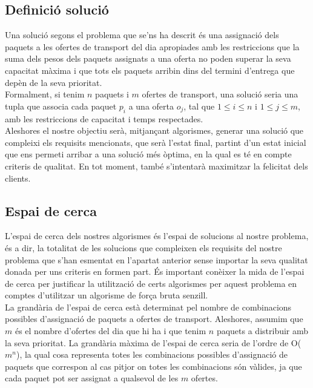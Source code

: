 \documentclass[a4paper]{article}
\begin{document}
	\subsection{Definició solució}

	Una solució segons el problema que se'ns ha descrit és una assignació dels paquets a les ofertes de transport del dia apropiades amb les restriccions que la suma dels pesos dels paquets assignats a una oferta no poden superar la seva capacitat màxima i que tots els paquets arribin dins del termini d'entrega que depèn de la seva prioritat. \\

	Formalment, si tenim $n$ paquets i $m$ ofertes de transport, una solució seria una tupla que associa cada paquet $p_i$ a una oferta $o_j$, tal que $1 \leq i \leq n$ i $1 \leq j \leq m$, amb les restriccions de capacitat i temps respectades. \\

	Aleshores el nostre objectiu serà, mitjançant algorismes, generar una solució que compleixi els requisits mencionats, que serà l'estat final, partint d'un estat inicial que ens permeti arribar a una solució més òptima, en la qual es té en compte criteris de qualitat. En tot moment, també s'intentarà maximitzar la felicitat dels clients. \\

	\subsection{Espai de cerca}

	L'espai de cerca dels nostres algorismes és l'espai de solucions al nostre problema, és a dir, la totalitat de les solucions que compleixen els requisits del nostre problema que s'han esmentat en l'apartat anterior sense importar la seva qualitat donada per uns criteris en formen part. És important conèixer la mida de l'espai de cerca per justificar la utilització de certs algorismes per aquest problema en comptes d'utilitzar un algorisme de força bruta senzill. \\

	La grandària de l'espai de cerca està determinat pel nombre de combinacions possibles d'assignació de paquets a ofertes de transport. Aleshores, assumim que $m$ és el nombre d'ofertes del dia que hi ha i que tenim $n$ paquets a distribuir amb la seva prioritat. La grandària màxima de l'espai de cerca seria de l'ordre de O($m^n$), la qual cosa representa totes les combinacions possibles d'assignació de paquets que correspon al cas pitjor on totes les combinacions són vàlides, ja que cada paquet pot ser assignat a qualsevol de les $m$ ofertes. \\
\end{document}
